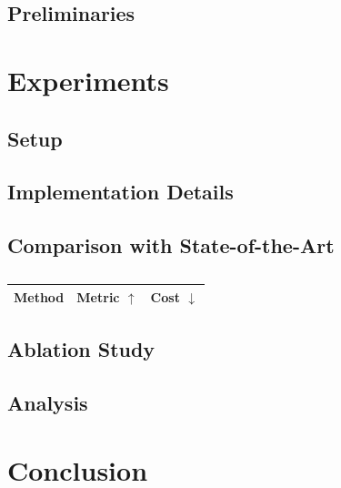 \documentclass[10pt,twocolumn,letterpaper]{article}
\begin{document}
\subsection{Preliminaries}
\subsection{}
\subsection{}

\section{Experiments}
\subsection{Setup}
\subsection{Implementation Details}
\subsection{Comparison with State-of-the-Art}

\begin{table}[t]
  \centering
  \caption{}
  \label{tab:main}
  \begin{tabular}{lcc}
    \toprule
    Method & Metric $\uparrow$ & Cost $\downarrow$ \\
    \midrule
    \bottomrule
  \end{tabular}
\end{table}

\subsection{Ablation Study}
\subsection{Analysis}

\section{Conclusion}

{\small}
\end{document}

